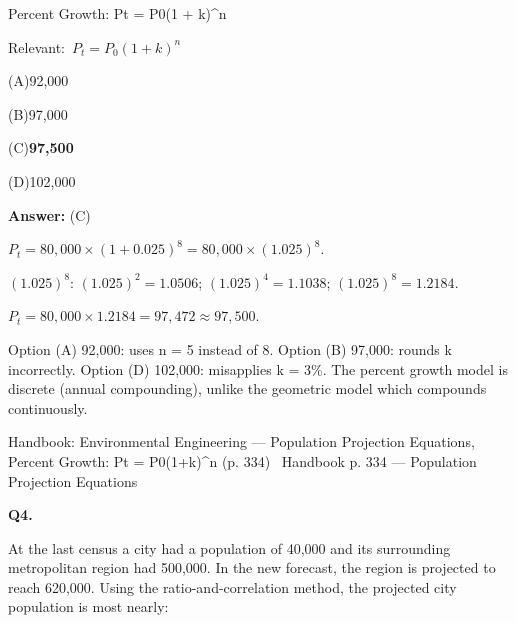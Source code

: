 \documentclass[11pt]{article}
\newcommand{\correct}[1]{\textbf{#1}\;{\color{accent}$\checkmark$}}
\newcommand{\optline}[2]{\par\noindent\hspace{1.2em}(#1)\hspace{0.6em}#2}
\begin{document}
Percent Growth: Pt = P0(1 + k)\textasciicircum{}n\par\vspace{3pt}
{\small\color{soft}Relevant:}\ $P_t = P_0(1 + k)^n$\par\vspace{3pt}
\optline{A}{92,000}
\optline{B}{97,000}
\optline{C}{\correct{97,500}}
\optline{D}{102,000}
\par\vspace{3pt}
\vspace{2pt}\par\noindent\colorbox{boxbg}{\parbox{\dimexpr\linewidth-2\fboxsep\relax}{%
\vspace{2pt}\textbf{Answer:} (C)\par\vspace{2pt}
{\small $P_t = 80{,}000 \times (1 + 0.025)^8 = 80{,}000 \times (1.025)^8$.

$(1.025)^8$: $(1.025)^2 = 1.0506$; $(1.025)^4 = 1.1038$; $(1.025)^8 = 1.2184$.

$P_t = 80{,}000 \times 1.2184 = 97{,}472 \approx 97{,}500$.

Option (A) 92,000: uses n = 5 instead of 8. Option (B) 97,000: rounds k incorrectly. Option (D) 102,000: misapplies k = 3\%. The percent growth model is discrete (annual compounding), unlike the geometric model which compounds continuously.}\par\vspace{2pt}
{\footnotesize\color{soft}Handbook: Environmental Engineering --- Population Projection Equations, Percent Growth: Pt = P0(1+k)\textasciicircum{}n (p. 334) \textbullet\ Handbook p. 334 --- Population Projection Equations}\vspace{2pt}
}}
\vspace{9pt}
\filbreak
\textbf{\color{accent}Q4.}\par\vspace{2pt}
At the last census a city had a population of 40,000 and its surrounding metropolitan region had 500,000. In the new forecast, the region is projected to reach 620,000. Using the ratio-and-correlation method, the projected city population is most nearly:
\end{document}

